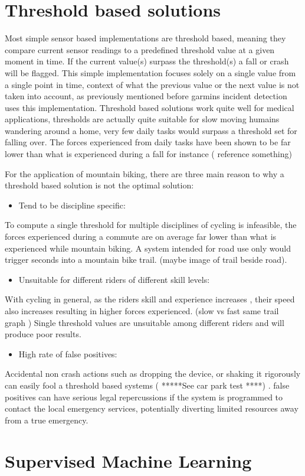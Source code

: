 \section{Threshold based solutions}
Most simple sensor based implementations are threshold based, meaning they compare current sensor readings to a predefined threshold value at a given moment in time. If the current value(s) surpass the threshold(s) a fall or crash will be flagged. This simple implementation focuses solely on a single value from a single point in time, context of what the previous value or the next value is not taken into account, as previously mentioned before garmins incident detection uses this implementation. Threshold based solutions work quite well for medical applications, thresholds are actually quite suitable for slow moving humains wandering around a home, very few daily tasks would surpass a threshold set for falling over. The forces experienced from daily tasks have been shown to be far lower than what is experienced during a fall for instance ( reference something)

For the application of mountain biking, there are three main reason to why a threshold based solution is not the optimal solution:

\begin{itemize}
\item Tend to be discipline specific:
\end{itemize}
 To compute a single threshold for multiple disciplines of cycling is infeasible, the forces experienced during a commute are on average far lower than what is experienced while mountain biking. A system intended for road use only would trigger seconds into a mountain bike trail. (maybe image of trail beside road).

\begin{itemize}
\item Unsuitable for different riders of different skill levels:
\end{itemize}
With cycling in general, as the riders skill and experience increases , their speed also increases resulting in higher forces experienced.  (slow vs fast same trail graph )
Single threshold values are unsuitable among different riders and will produce poor results. 

\begin{itemize}
\item High rate of false positives:
\end{itemize}
Accidental non crash actions such as dropping the device, or shaking it rigorously can easily fool a threshold based systems ( *****See car park test ****) . false positives can have serious legal repercussions if the system is programmed to contact the local emergency services, potentially diverting limited resources away from a true emergency.  


\section {Supervised Machine Learning}
